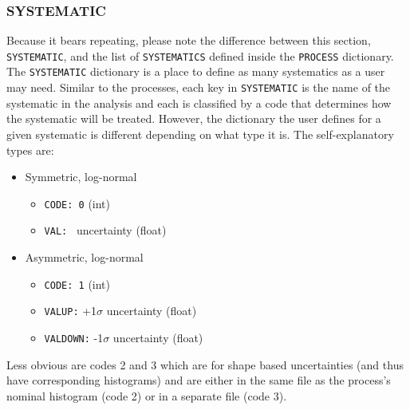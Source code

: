\documentclass[letter]{article}
\begin{document}
        \subsubsection{SYSTEMATIC}
            Because it bears repeating, please note the difference between this section, \verb"SYSTEMATIC", and the list of \verb"SYSTEMATICS" defined inside the \verb"PROCESS" dictionary. The \verb"SYSTEMATIC" dictionary is a place to define as many systematics as a user may need. Similar to the processes, each key in \verb"SYSTEMATIC" is the name of the systematic in the analysis and each is classified by a code that determines how the systematic will be treated. However, the dictionary the user defines for a given systematic is different depending on what type it is. The self-explanatory types are:
            \begin{itemize}
                \item Symmetric, log-normal
                \begin{itemize}
                    \item \verb"CODE: 0" (int)
                    \item \verb"VAL: " uncertainty (float)
                \end{itemize}
                \item Asymmetric, log-normal
                \begin{itemize}
                    \item \verb"CODE: 1" (int)
                    \item \verb"VALUP:" +1$\sigma$ uncertainty (float)
                    \item \verb"VALDOWN:" -1$\sigma$ uncertainty (float)
                \end{itemize}
            \end{itemize}
            Less obvious are codes 2 and 3 which are for shape based uncertainties (and thus have corresponding histograms) and are either in the same file as the process's nominal histogram (code 2) or in a separate file (code 3). 
\end{document}
